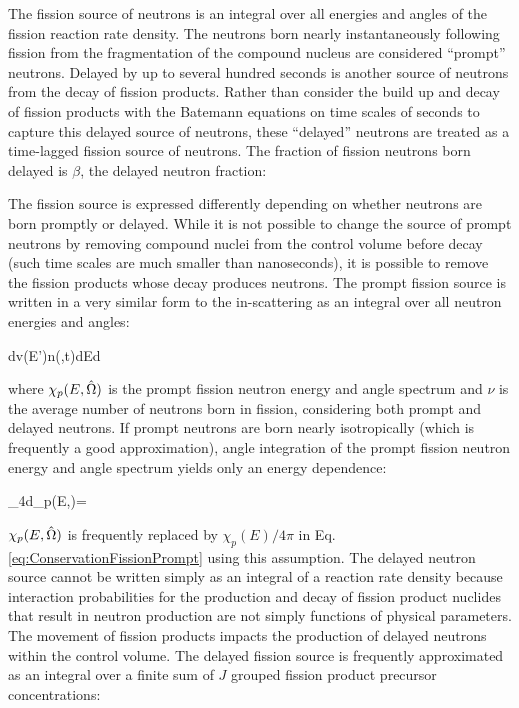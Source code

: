 The fission source of neutrons is an integral over all energies and angles of the fission reaction rate density. The neutrons born nearly instantaneously following fission from the fragmentation of the compound nucleus are considered ``prompt'' neutrons. Delayed by up to several hundred seconds is another source of neutrons from the decay of fission products. Rather than consider the build up and decay of fission products with the Batemann equations on time scales of seconds to capture this delayed source of neutrons, these ``delayed'' neutrons are treated as a time-lagged fission source of neutrons. The fraction of fission neutrons born delayed is \(\beta\), the delayed neutron fraction:

\beq
\label{eq:BetaDef}
\beta\equiv{}
\eeq

The fission source is expressed differently depending on whether neutrons are born promptly or delayed. While it is not possible to change the source of prompt neutrons by removing compound nuclei from the control volume before decay (such time scales are much smaller than nanoseconds), it is possible to remove the fission products whose decay produces neutrons. The prompt fission source is written in a very similar form to the in-scattering as an integral over all neutron energies and angles:

\beq
\label{eq:ConservationFissionPrompt}
\left\lbrack\int d\volume\promptfissionsource v(E')n(,t)\right\rbrack dEd\hO
\eeq

where \(\chi_p(E,\hat{\Omega})\) is the prompt fission neutron energy and angle spectrum and \(\nu\) is the average number of neutrons born in fission, considering both prompt and delayed neutrons. If prompt neutrons are born nearly isotropically (which is frequently a good approximation), angle integration of the prompt fission neutron energy and angle spectrum yields only an energy dependence:

\beq
\label{eq:prompt_isotropic}
\int_{4\pi}d\hO \chi_p(E,\hO)=
\eeq

\(\chi_p(E,\hat{\Omega})\) is frequently replaced by \(\chi_p(E)/4\pi\) in Eq. \eqref{eq:ConservationFissionPrompt} using this assumption. The delayed neutron source cannot be written simply as an integral of a reaction rate density because interaction probabilities for the production and decay of fission product nuclides that result in neutron production are not simply functions of physical parameters. The movement of fission products impacts the production of delayed neutrons within the control volume. The delayed fission source is frequently approximated as an integral over a finite sum of \(J\) grouped fission product precursor concentrations:

